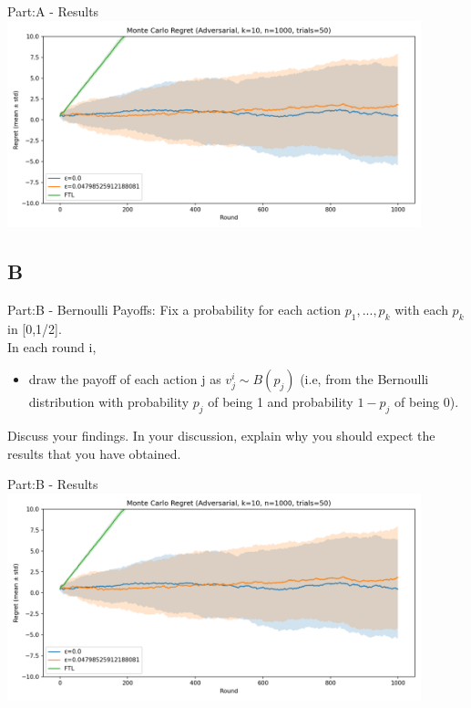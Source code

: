 \documentclass{beamer}
\begin{document}
\begin{frame}{Part:A - Results}
\includegraphics[width=0.9\textwidth]{figures/adv_mc_regret.png}

\end{frame}

\subsection{B}
\begin{frame}{Part:B - Bernoulli Payoffs:}
Fix a probability for each action $p_{1},...,p_{k}$ with each $p_{k}$ in [0,1/2].\\
In each round i,
\begin{itemize}
    \item draw the payoff of each action j as $v^{i}_{j} \sim B(p_{j})$ (i.e, from the Bernoulli distribution with probability $p_j$ of being 1 and probability $1-p_{j}$ of being 0).
\end{itemize}
Discuss your findings.  In your discussion, explain why you should expect the results that you have obtained.  
\end{frame}

\begin{frame}{Part:B - Results}
\includegraphics[width=0.9\textwidth]{figures/adv_mc_regret.png}
\end{frame}
\end{document}
